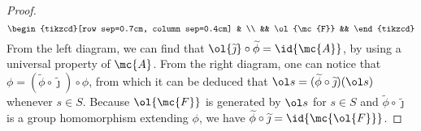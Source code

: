 \begin{proof}
\begin{equation*}
\begin{tikzcd}[row sep=0.7cm, column sep=0.4cm]
        &
        \\
        &&
        \ol{\mc{F}}
        &&
    \end{tikzcd}
    \end{equation*}
    From the left diagram, we can find that $\ol{\widetilde\jmath}\circ\widetilde\phi=\id{\mc{A}}$, by using a universal property of $\mc{A}$.
    From the right diagram, one can notice that $\phi=(\widetilde\phi\circ\widetilde\jmath)\circ\phi$, from which it can be deduced that $\ol s=(\widetilde\phi\circ\widetilde\jmath)(\ol s)$ whenever $s\in S$.
    Because $\ol{\mc{F}}$ is generated by $\ol s$ for $s\in S$ and $\widetilde\phi\circ\widetilde\jmath$ is a group homomorphism extending $\phi$, we have $\widetilde\phi\circ\widetilde\jmath=\id{\mc{\ol{F}}}$.
\end{proof}